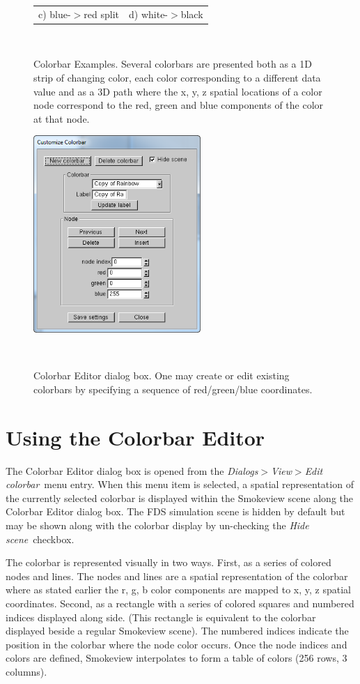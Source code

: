 \documentclass[11pt,twoside]{book}
\begin{document}
\begin{figure}[bph]
\begin{center}
\begin{tabular}{cc}
c) blue-$>$red split&d) white-$>$black
\end{tabular}
\end{center}
\caption[Colorbar Examples]{
Colorbar Examples.  Several colorbars are presented both as a 1D strip
of changing color, each color corresponding to a different
data value and as a 3D path where the x, y, z spatial locations
of a color node correspond to the red, green and blue components
of the color at that node.}\ \label{figCOLORBAR_EXAMPLES}
\end{figure}

\begin{figure}[bph]
\begin{center}
\includegraphics[width=2.5in]{FIGURES/figCOLORBAR_EDITOR}
\end{center}
\caption[Colorbar Editor dialog box.]{ Colorbar
Editor dialog box. One may create or edit existing colorbars by specifying a sequence of red/green/blue coordinates.  }\ \label{figCOLORBAR}
\end{figure}

\section{Using the Colorbar Editor}
\label{section:colorbar}
The Colorbar Editor dialog box is opened from the {\em
Dialogs$>$View$>$Edit colorbar}\ menu entry. When this menu item is
selected, a spatial representation of the currently selected
colorbar is displayed within the Smokeview scene along the
Colorbar Editor dialog box.  The FDS simulation scene is hidden
by default but may be shown along with the colorbar display by
un-checking the {\em Hide scene}\ checkbox.

The colorbar is represented visually in two ways.  First, as a series
of colored nodes and lines.
The nodes and lines are a spatial representation of the colorbar where as
stated earlier the r, g, b color components are mapped to x, y, z spatial
coordinates.
Second, as a rectangle with a series of colored squares and numbered
indices
displayed along side. (This rectangle is equivalent to the colorbar
displayed beside a regular Smokeview scene).  The numbered indices indicate
the position in the colorbar where the node color occurs.
Once the node indices and colors are defined, Smokeview interpolates to
form a table of colors (256 rows, 3 columns).
\end{document}
